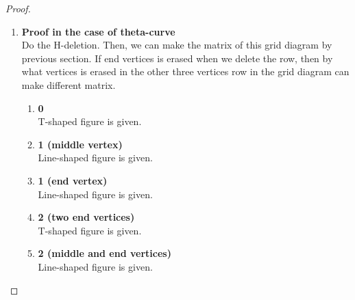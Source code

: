 \documentclass{article}
\theoremstyle{definition}
\theoremstyle{theorem}
\theoremstyle{proposition}
\theoremstyle{corollary}
\begin{document}
\begin{proof}
\begin{enumerate}
\item \textbf{Proof in the case of theta-curve}\\
Do the H-deletion. Then, we can make the matrix of this grid diagram by previous section. If end vertices is erased when we delete the row, then by what vertices is erased in the other three vertices row in the grid diagram can make different matrix.
\begin{enumerate}
    \item \textbf{0}\\
    T-shaped figure is given.
    \item \textbf{1 (middle vertex)}\\
    Line-shaped figure is given.
    \item \textbf{1 (end vertex)}\\
    Line-shaped figure is given.
    \item \textbf{2 (two end vertices)}\\
    T-shaped figure is given.
    \item \textbf{2 (middle and end vertices)}\\
    Line-shaped figure is given.
\end{enumerate}


\end{enumerate}
\end{proof}
\end{document}
